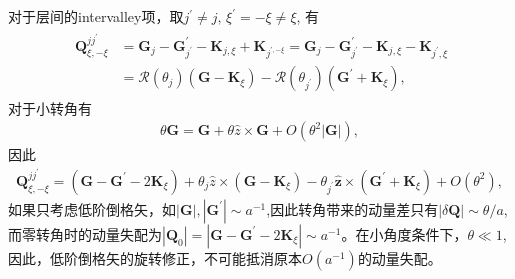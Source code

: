 \documentclass[10pt, oneside]{article}
\begin{document}
对于层间的intervalley项，取\(j^{\prime} \neq j, \, \xi^{\prime} = -\xi \neq \xi \), 有
\begin{align}\
	\begin{split}
			\bm{Q}^{jj^{\prime}}_{\xi,-\xi} & = \bm{G}_{j} - \bm{G}^{\prime}_{j^{\prime}} - \bm{K}_{j,\xi} + \bm{K}_{j^{\prime, - \xi}} = \bm{G}_{j} - \bm{G}^{\prime}_{j^{\prime}} - \bm{K}_{j,\xi} - \bm{K}_{j^{\prime},\xi} \\
			& = \mathcal{R} \left(\theta_{j}\right) \left(\bm{G} - \bm{K}_{\xi}\right) - \mathcal{R}\left(\theta_{j^{\prime}}\right) \left(\bm{G}^{\prime} + \bm{K}_{\xi} \right),
	\end{split}
\end{align}
对于小转角有
\begin{align}
	\mathcal{\theta} \bm{G} = \bm{G} + \theta \hat{z} \times \bm{G} + O \left(\theta^{2} \left|\bm{G}\right|\right),
\end{align}
因此
\begin{align}
	\bm{Q}^{jj^{\prime}}_{\xi,-\xi} = \left(\bm{G} - \bm{G}^{\prime} - 2 \bm{K}_{\xi}\right) + \theta_{j} \hat{z} \times \left(\bm{G} - \bm{K}_{\xi}\right)	- \theta_{j^{\prime}} \hat{\bm{z}} \times \left(\bm{G}^{\prime} + \bm{K}_{\xi}\right) + O \left(\theta^{2}\right),
\end{align}
如果只考虑低阶倒格矢，如\(\left|\bm{G}\right|, \left|\bm{G}^{\prime}\right| \sim a^{-1}\),因此转角带来的动量差只有\(\left|\delta \bm{Q}\right| \sim \theta/a\), 而零转角时的动量失配为\(\left|\bm{Q}_{0}\right| = \left|\bm{G} - \bm{G}^{\prime} - 2 \bm{K}_{\xi}\right| \sim a^{-1}\)。在小角度条件下，\(\theta \ll 1\), 因此，低阶倒格矢的旋转修正，不可能抵消原本\(O\left(a^{-1}\right)\)的动量失配。
\end{document}
